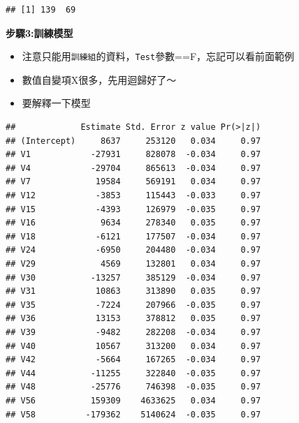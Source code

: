 \documentclass[
]{book}
\newenvironment{Shaded}{\begin{snugshade}}{\end{snugshade}}
\newcommand{\DataTypeTok}[1]{\textcolor[rgb]{0.13,0.29,0.53}{#1}}
\newcommand{\KeywordTok}[1]{\textcolor[rgb]{0.13,0.29,0.53}{\textbf{#1}}}
\newcommand{\NormalTok}[1]{#1}
\newcommand{\OperatorTok}[1]{\textcolor[rgb]{0.81,0.36,0.00}{\textbf{#1}}}
\newcommand{\StringTok}[1]{\textcolor[rgb]{0.31,0.60,0.02}{#1}}
\providecommand{\tightlist}{%
  \setlength{\itemsep}{0pt}\setlength{\parskip}{0pt}}
\begin{document}
\begin{verbatim}
## [1] 139  69
\end{verbatim}

\textbf{步驟3:訓練模型}

\begin{itemize}
\tightlist
\item
  注意只能用\texttt{訓練組}的資料，\texttt{Test}參數==F，忘記可以看前面範例
\item
  數值自變項X很多，先用迴歸好了～
\item
  要解釋一下模型
\end{itemize}

\begin{Shaded}
\end{Shaded}

\begin{verbatim}
##             Estimate Std. Error z value Pr(>|z|)
## (Intercept)     8637     253120   0.034     0.97
## V1            -27931     828078  -0.034     0.97
## V4            -29704     865613  -0.034     0.97
## V7             19584     569191   0.034     0.97
## V12            -3853     115443  -0.033     0.97
## V15            -4393     126979  -0.035     0.97
## V16             9634     278340   0.035     0.97
## V18            -6121     177507  -0.034     0.97
## V24            -6950     204480  -0.034     0.97
## V29             4569     132801   0.034     0.97
## V30           -13257     385129  -0.034     0.97
## V31            10863     313890   0.035     0.97
## V35            -7224     207966  -0.035     0.97
## V36            13153     378812   0.035     0.97
## V39            -9482     282208  -0.034     0.97
## V40            10567     313200   0.034     0.97
## V42            -5664     167265  -0.034     0.97
## V44           -11255     322840  -0.035     0.97
## V48           -25776     746398  -0.035     0.97
## V56           159309    4633625   0.034     0.97
## V58          -179362    5140624  -0.035     0.97
\end{verbatim}
\end{document}

